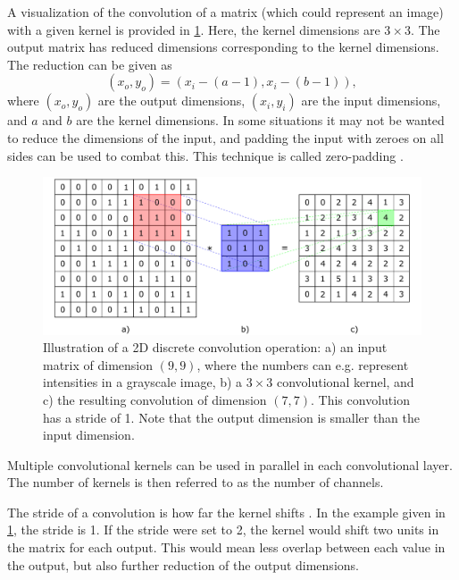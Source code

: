 A visualization of the convolution of a matrix (which could represent an image) with a given kernel is provided in \cref{fig:convolution}. Here, the kernel dimensions are $3\times3$. The output matrix has reduced dimensions corresponding to the kernel dimensions. The reduction can be given as 
\begin{equation}
    \left( x_o,y_o \right) = \left( x_i - \left(a - 1\right), x_i - \left( b - 1 \right) \right),
\end{equation}
where $(x_o,y_o)$ are the output dimensions, $(x_i,y_i)$ are the input dimensions, and $a$ and $b$ are the kernel dimensions. In some situations it may not be wanted to reduce the dimensions of the input, and padding the input with zeroes on all sides can be used to combat this. This technique is called zero-padding \cite{oshea2015introduction}. 
\begin{figure}[htbp]  
    \centering
    \includegraphics[width=.85\textwidth]{figures/convolution.pdf}
    \caption[Illustration of a 2D discrete convolution]{Illustration of a 2D discrete convolution operation: a) an input matrix of dimension $(9,9)$, where the numbers can e.g. represent intensities in a grayscale image, b) a $3\times3$ convolutional kernel, and c) the resulting convolution of dimension $(7,7)$. This convolution has a stride of 1. Note that the output dimension is smaller than the input dimension. }
    \label{fig:convolution}
\end{figure}

Multiple convolutional kernels can be used in parallel in each convolutional layer. The number of kernels is then referred to as the number of channels. 

The stride of a convolution is how far the kernel shifts \cite{oshea2015introduction}. In the example given in \cref{fig:convolution}, the stride is 1. If the stride were set to 2, the kernel would shift two units in the matrix for each output. This would mean less overlap between each value in the output, but also further reduction of the output dimensions. 

